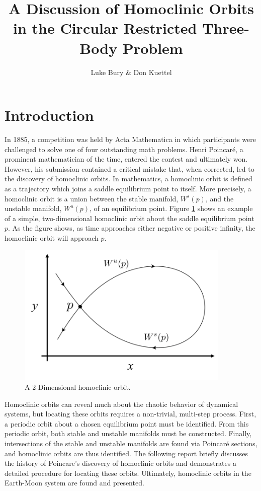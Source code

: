 \documentclass[11pt]{article} %
\title{A Discussion of Homoclinic Orbits in the Circular Restricted Three-Body Problem}
\author{Luke Bury \& Don Kuettel}
\begin{document}
\maketitle
\section{Introduction}
In 1885, a competition was held by Acta Mathematica in which participants were challenged to solve one of four outstanding math problems. Henri Poincaré, a prominent mathematician of the time, entered the contest and ultimately won. However, his submission contained a critical mistake that, when corrected, led to the discovery of homoclinic orbits. In mathematics, a homoclinic orbit is defined as a trajectory which joins a saddle equilibrium point to itself. More precisely, a homoclinic orbit is a union between the stable manifold, $W^s(p)$, and the unstable manifold, $W^u(p)$, of an equilibrium point. Figure \ref{f:homoclinic_example} shows an example of a simple, two-dimensional homoclinic orbit about the saddle equilibrium point $p$. As the figure shows, as time approaches either negative or positive infinity, the homoclinic orbit will approach $p$. 

\begin{figure}[H]
    \centering
    \includegraphics[width=4in]{homoclinic_orbit.png}
    \caption{A 2-Dimensional homoclinic orbit.}
    \label{f:homoclinic_example}
\end{figure}

Homoclinic orbits can reveal much about the chaotic behavior of dynamical systems, but locating these orbits requires a non-trivial, multi-step process. First, a periodic orbit about a chosen equilibrium point must be identified. From this periodic orbit, both stable and unstable manifolds must be constructed. Finally, intersections of the stable and unstable manifolds are found via Poincaré sections, and homoclinic orbits are thus identified. The following report briefly discusses the history of Poincare's discovery of homoclinic orbits and demonstrates a detailed procedure for locating these orbits. Ultimately, homoclinic orbits in the Earth-Moon system are found and presented.
\end{document}
